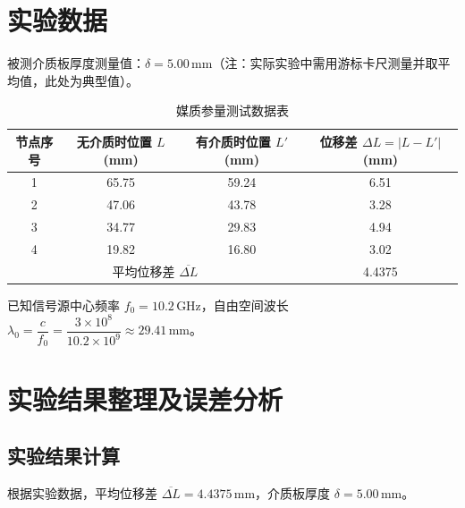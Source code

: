 \documentclass{../ElectromagneticFieldTemplate}
\begin{document}
\section{实验数据}

被测介质板厚度测量值：\(\delta = 5.00\,\text{mm}\)（注：实际实验中需用游标卡尺测量并取平均值，此处为典型值）。

\begin{table}[H]
    \centering
    \caption{媒质参量测试数据表}
    \renewcommand{\arraystretch}{1.5}
    \begin{tabular}{|c|c|c|c|}
        \hline
        节点序号 & 无介质时位置 \(L\) (mm) & 有介质时位置 \(L'\) (mm) & 位移差 \(\Delta L = |L - L'|\) (mm) \\
        \hline
        1 & 65.75 & 59.24 & 6.51 \\
        \hline
        2 & 47.06 & 43.78 & 3.28 \\
        \hline
        3 & 34.77 & 29.83 & 4.94 \\
        \hline
        4 & 19.82 & 16.80 & 3.02 \\
        \hline
        \multicolumn{3}{|c|}{平均位移差 \(\overline{\Delta L}\)} & 4.4375 \\
        \hline
    \end{tabular}
\end{table}

已知信号源中心频率 \(f_0 = 10.2\,\text{GHz}\)，自由空间波长 \(\lambda_0 = \dfrac{c}{f_0} = \dfrac{3 \times 10^8}{10.2 \times 10^9} \approx 29.41\,\text{mm}\)。

\section{实验结果整理及误差分析}

\subsection{实验结果计算}

根据实验数据，平均位移差 \(\overline{\Delta L} = 4.4375\,\text{mm}\)，介质板厚度 \(\delta = 5.00\,\text{mm}\)。
\end{document}
